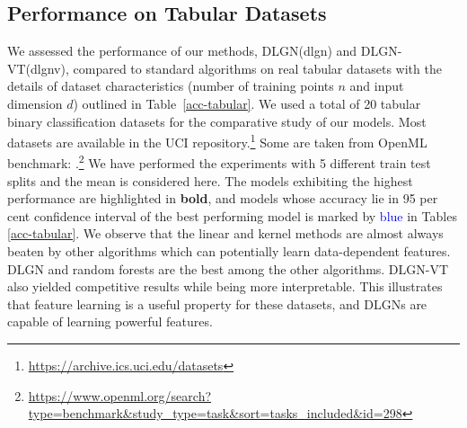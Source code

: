 \documentclass{article} %
\renewcommand{\>}{{\rightarrow}}
\renewcommand{\=}{\stackrel{\triangle}{=}}
\newcommand{\0}{{\mathbf 0}}
\begin{document}
\subsection{Performance on Tabular Datasets}\label{sec:td}
We assessed the performance of our methods, DLGN(dlgn) and DLGN-VT(dlgnv), compared to standard algorithms on real tabular datasets with the details of dataset characteristics (number of training points $n$ and input dimension $d$) outlined in Table~\ref{acc-tabular}. We used a total of 20 tabular binary classification datasets for the comparative study of our models. Most datasets are available in the UCI repository.\footnote{\url{https://archive.ics.uci.edu/datasets}} Some are taken from OpenML benchmark: \citep{grinsztajn2022tree}.\footnote{\url{https://www.openml.org/search?type=benchmark&study_type=task&sort=tasks_included&id=298}} We have performed the experiments with 5 different train test splits and the mean is considered here. The models exhibiting the highest performance are highlighted in \textbf{bold}, and models whose accuracy lie in 95 per cent confidence interval of the best performing model is marked by \textcolor{blue}{blue} in Tables \ref{acc-tabular}. We observe that the linear and kernel methods are almost always beaten by other algorithms which can potentially learn data-dependent features.
DLGN and random forests are the best among the other algorithms. DLGN-VT also yielded competitive results while being more interpretable. This illustrates that feature learning is a useful property for these datasets, and DLGNs are capable of learning powerful features.
\end{document}
